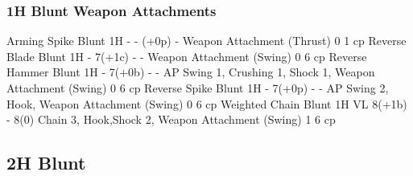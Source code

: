 \documentclass[oneside,11pt,english]{book}
\begin{document}
\subsubsection{1H Blunt Weapon Attachments}%
Arming Spike Blunt 1H - - (+0p) - Weapon Attachment (Thrust) 0 1 cp
Reverse Blade Blunt 1H - 7(+1c) - - Weapon Attachment (Swing) 0 6 cp
Reverse Hammer Blunt 1H - 7(+0b) - - AP Swing 1, Crushing 1, Shock 1, Weapon Attachment (Swing) 0 6 cp
Reverse Spike Blunt 1H - 7(+0p) - - AP Swing 2, Hook, Weapon Attachment (Swing) 0 6 cp
Weighted Chain Blunt 1H VL 8(+1b) - 8(0) Chain 3, Hook,Shock 2, Weapon Attachment (Swing) 1 6 cp
\subsection{2H Blunt} %
\end{document}
